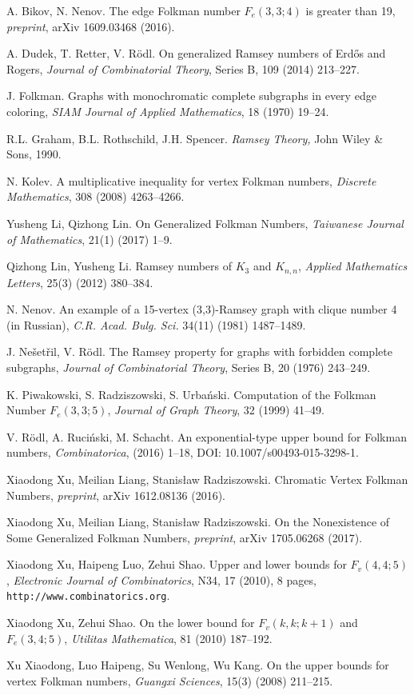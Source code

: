 \begin{thebibliography}{22}

A. Bikov, N. Nenov.
The edge Folkman number $F_e(3,3;4)$ is greater than 19,
{\em preprint}, arXiv 1609.03468 (2016).

A. Dudek, T. Retter, V. R\"{o}dl.
On generalized Ramsey numbers of Erd\H{o}s and Rogers,
{\em Journal of Combinatorial Theory}, Series B,
109 (2014) 213--227.

J. Folkman.
Graphs with monochromatic complete subgraphs in every edge coloring,
{\em SIAM Journal of Applied Mathematics}, 18 (1970) 19--24.

R.L. Graham, B.L. Rothschild, J.H. Spencer.
{\em Ramsey Theory,}
John Wiley \& Sons, 1990.

N. Kolev.
A multiplicative inequality for vertex Folkman numbers,
{\em Discrete Mathematics}, 308 (2008) 4263--4266.

Yusheng Li, Qizhong Lin.
On Generalized Folkman Numbers,
{\em Taiwanese Journal of Mathematics},
21(1) (2017) 1--9.

Qizhong Lin, Yusheng Li.
Ramsey numbers of $K_3$ and $K_{n,n}$,
{\em Applied Mathematics Letters},
25(3) (2012) 380--384.

N. Nenov.
An example of a 15-vertex (3,3)-Ramsey graph with
clique number 4 (in Russian),
{\em C.R. Acad. Bulg. Sci.}
34(11) (1981) 1487--1489.

J. Ne\v{s}et\v{r}il, V. R\"{o}dl.
The Ramsey property for graphs with forbidden complete subgraphs,
{\em Journal of Combinatorial Theory},
Series B, 20 (1976) 243--249.

K. Piwakowski, S. Radziszowski, S. Urba\'{n}ski.
Computation of the Folkman Number $F_e(3,3;5)$,
{\em Journal of Graph Theory}, 32 (1999) 41--49.

V. R\"{o}dl, A. Ruci\'{n}ski, M. Schacht.
An exponential-type upper bound for Folkman numbers,
{\em Combinatorica}, (2016) 1--18,
DOI: 10.1007/s00493-015-3298-1.

Xiaodong Xu, Meilian Liang, Stanis{\l}aw Radziszowski.
Chromatic Vertex Folkman Numbers,
{\em preprint}, arXiv 1612.08136 (2016).

Xiaodong Xu, Meilian Liang, Stanis{\l}aw Radziszowski.
On the Nonexistence of Some Generalized Folkman Numbers,
{\em preprint}, arXiv 1705.06268 (2017).

Xiaodong Xu, Haipeng Luo, Zehui Shao.
Upper and lower bounds for $F_v(4,4;5)$,
{\em Electronic Journal of Combinatorics}, N34, 17 (2010), 8 pages,
{\tt http://www.combinatorics.org}.

Xiaodong Xu, Zehui Shao.
On the lower bound for $F_v(k,k;k+1)$ and $F_e(3,4;5)$,
{\em Utilitas Mathematica}, 81 (2010) 187--192.

Xu Xiaodong, Luo Haipeng, Su Wenlong, Wu Kang.
On the upper bounds for vertex Folkman numbers,
{\em Guangxi Sciences}, 15(3) (2008) 211--215.

\end{thebibliography}
